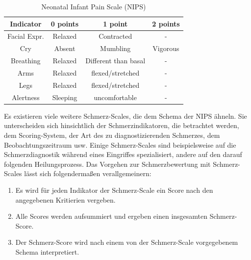 \begin{table}[h]

	\centering
	\caption[Neonatal Infant Pain Scale]{Neonatal Infant Pain Scale (NIPS) \cite{nips}}
	\label{tab:nips}
	\begin{tabular}{@{}cccc@{}}
		\toprule
		\textbf{Indicator}     & \textbf{0 points} & \textbf{1 point}     & \textbf{2 points} \\ \midrule
		Facial Expr. & Relaxed           & Contracted           & -                 \\
		Cry               & Absent            & Mumbling             & Vigorous          \\
		Breathing         & Relaxed           & Different than basal & -                 \\
		Arms              & Relaxed           & flexed/stretched     & -                 \\
		Legs              & Relaxed           & flexed/stretched     & -                 \\
		Alertness         & Sleeping          & uncomfortable        & -                 \\ \bottomrule
	\end{tabular}
\end{table}


Es existieren viele weitere Schmerz-Scales, die dem Schema der NIPS ähneln. Sie unterscheiden sich hinsichtlich der Schmerzindikatoren, die betrachtet werden, dem Scoring-System, der Art des zu diagnostizierenden Schmerzes, dem Beobachtungszeitraum usw. Einige Schmerz-Scales sind beispielsweise auf die Schmerzdiagnostik während eines Eingriffes spezialisiert, andere auf den darauf folgenden Heilungsprozess. Das Vorgehen zur Schmerzbewertung mit Schmerz-Scales lässt sich folgendermaßen verallgemeinern:

\begin{enumerate}
\item Es wird für jeden Indikator der Schmerz-Scale ein Score nach den angegebenen Kritierien vergeben.
\item Alle Scores werden aufsummiert und ergeben einen insgesamten Schmerz-Score.
\item Der Schmerz-Score wird nach einem von der Schmerz-Scale vorgegebenem Schema interpretiert.\cite{aboutKids}
\end{enumerate}

